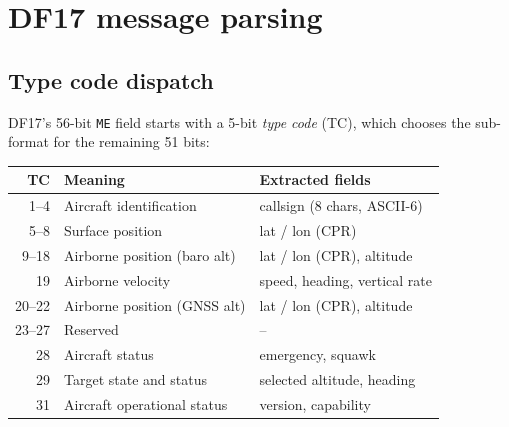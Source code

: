 \documentclass[11pt,a4paper]{article}
\begin{document}
\begin{center}
\end{center}

\section{DF17 message parsing}

\subsection{Type code dispatch}

DF17's 56-bit \texttt{ME} field starts with a 5-bit \emph{type code}
(TC), which chooses the sub-format for the remaining 51 bits:

\begin{center}
\begin{tabular}{r l l}
\toprule
\textbf{TC} & \textbf{Meaning}                & \textbf{Extracted fields}          \\
\midrule
1--4        & Aircraft identification         & callsign (8 chars, ASCII-6)        \\
5--8        & Surface position                 & lat / lon (CPR)                     \\
9--18       & Airborne position (baro alt)    & lat / lon (CPR), altitude          \\
19          & Airborne velocity                & speed, heading, vertical rate      \\
20--22      & Airborne position (GNSS alt)    & lat / lon (CPR), altitude          \\
23--27      & Reserved                         & --                                  \\
28          & Aircraft status                  & emergency, squawk                   \\
29          & Target state and status          & selected altitude, heading         \\
31          & Aircraft operational status      & version, capability                 \\
\bottomrule
\end{tabular}
\end{center}
\end{document}
